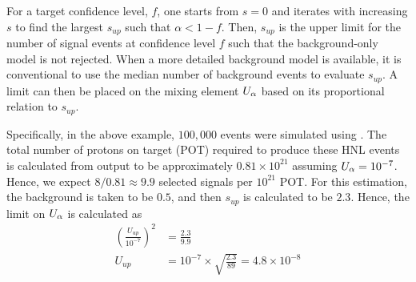         For a target confidence level, $f$, one starts from $s=0$ and iterates with increasing $s$ to find the largest $s_{up}$ such that $\alpha < 1-f$. 
        Then, $s_{up}$ is the upper limit for the number of signal events at confidence level $f$ such that the background-only model is not rejected. 
        When a more detailed background model is available, it is conventional to use the median number of background events to evaluate $s_{up}$.
        A limit can then be placed on the mixing element $U_{\alpha}$ based on its proportional relation to $s_{up}$.

        Specifically, in the above example, $100,000$ \genie events were simulated using . 
        The total number of protons on target (POT) required to produce these HNL events is calculated from  output to be approximately $0.81\times10^{21}$ assuming $U_{\alpha}=10^{-7}$. 
        Hence, we expect $8/0.81\approx9.9$ selected signals per $10^{21}$ POT.
        For this estimation, the background is taken to be $0.5$, and then $s_{up}$ is calculated to be $2.3$. 
        Hence, the limit on $U_{\alpha}$ is calculated as 
        \begin{align}
            \left(\frac{U_{up}}{10^{-7}}\right)^2 & =  \frac{2.3}{9.9} \\
            U_{up} & = 10^{-7} \times \sqrt{\frac{2.3}{89}} = 4.8\times10^{-8}
        \end{align}


